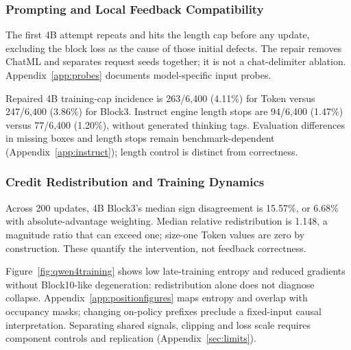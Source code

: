 \subsubsection{Prompting and Local Feedback Compatibility}
The first 4B attempt repeats and hits the length cap before any update, excluding the block loss as the cause of those initial defects. The repair removes ChatML and separates request seeds together; it is not a chat-delimiter ablation. Appendix~\ref{app:probes} documents model-specific input probes.

Repaired 4B training-cap incidence is 263/6,400 (4.11\%) for Token versus 247/6,400 (3.86\%) for Block3. Instruct engine length stops are 94/6,400 (1.47\%) versus 77/6,400 (1.20\%), without generated thinking tags. Evaluation differences in missing boxes and length stops remain benchmark-dependent (Appendix~\ref{app:instruct}); length control is distinct from correctness.

\subsubsection{Credit Redistribution and Training Dynamics}
Across 200 updates, 4B Block3's median sign disagreement is 15.57\%, or 6.68\% with absolute-advantage weighting. Median relative redistribution is 1.148, a magnitude ratio that can exceed one; size-one Token values are zero by construction. These quantify the intervention, not feedback correctness.

Figure~\ref{fig:qwen4training} shows low late-training entropy and reduced gradients without Block10-like degeneration: redistribution alone does not diagnose collapse. Appendix~\ref{app:positionfigures} maps entropy and overlap with occupancy masks; changing on-policy prefixes preclude a fixed-input causal interpretation. Separating shared signals, clipping and loss scale requires component controls and replication (Appendix~\ref{sec:limits}).
